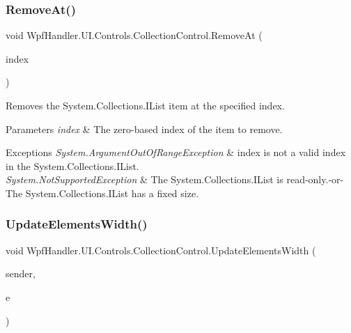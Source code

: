 \subsubsection{\texorpdfstring{Remove\+At()}{RemoveAt()}}
{\footnotesize\ttfamily void Wpf\+Handler.\+U\+I.\+Controls.\+Collection\+Control.\+Remove\+At (\begin{DoxyParamCaption}\item[{int}]{index }\end{DoxyParamCaption})}



Removes the System.\+Collections.\+I\+List item at the specified index. 


\begin{DoxyParams}{Parameters}
{\em index} & The zero-\/based index of the item to remove.\\
\hline
\end{DoxyParams}

\begin{DoxyExceptions}{Exceptions}
{\em System.\+Argument\+Out\+Of\+Range\+Exception} & index is not a valid index in the System.\+Collections.\+I\+List. \\
\hline
{\em System.\+Not\+Supported\+Exception} & The System.\+Collections.\+I\+List is read-\/only.-\/or-\/ The System.\+Collections.\+I\+List has a fixed size. \\
\hline
\end{DoxyExceptions}
\mbox{\label{class_wpf_handler_1_1_u_i_1_1_controls_1_1_collection_control_a6df510adc9706b127f2179a6cc123799}} 
\subsubsection{\texorpdfstring{Update\+Elements\+Width()}{UpdateElementsWidth()}}
{\footnotesize\ttfamily void Wpf\+Handler.\+U\+I.\+Controls.\+Collection\+Control.\+Update\+Elements\+Width (\begin{DoxyParamCaption}\item[{object}]{sender,  }\item[{Size\+Changed\+Event\+Args}]{e }\end{DoxyParamCaption})\hspace{0.3cm}{\ttfamily [protected]}}



